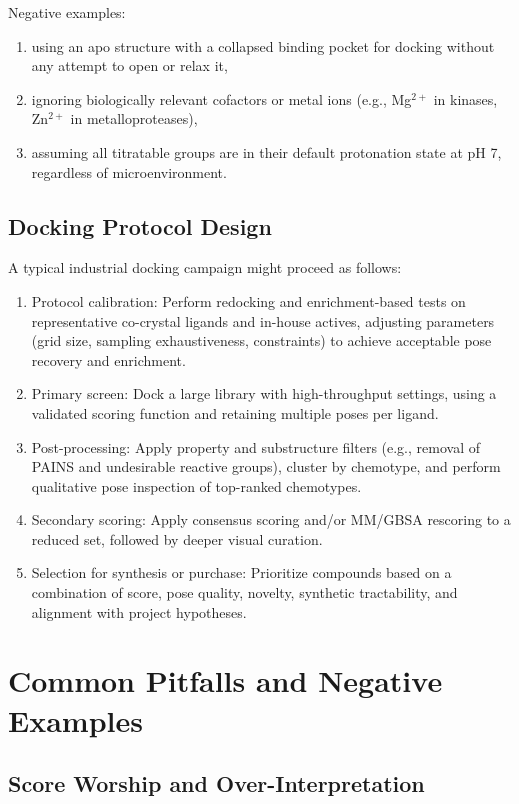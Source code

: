 \documentclass[12pt,a4paper]{article}
\begin{document}
Negative examples:

\begin{enumerate}
  \item using an apo structure with a collapsed binding pocket for docking without any attempt to open or relax it,
  \item ignoring biologically relevant cofactors or metal ions (e.g., Mg$^{2+}$ in kinases, Zn$^{2+}$ in metalloproteases),
  \item assuming all titratable groups are in their default protonation state at pH 7, regardless of microenvironment.
\end{enumerate}

\subsection{Docking Protocol Design}

A typical industrial docking campaign might proceed as follows:

\begin{enumerate}
  \item Protocol calibration: Perform redocking and enrichment-based tests on representative co-crystal ligands and in-house actives, adjusting parameters (grid size, sampling exhaustiveness, constraints) to achieve acceptable pose recovery and enrichment.
  \item Primary screen: Dock a large library with high-throughput settings, using a validated scoring function and retaining multiple poses per ligand.
  \item Post-processing: Apply property and substructure filters (e.g., removal of PAINS and undesirable reactive groups), cluster by chemotype, and perform qualitative pose inspection of top-ranked chemotypes.
  \item Secondary scoring: Apply consensus scoring and/or MM/GBSA rescoring to a reduced set, followed by deeper visual curation.
  \item Selection for synthesis or purchase: Prioritize compounds based on a combination of score, pose quality, novelty, synthetic tractability, and alignment with project hypotheses.
\end{enumerate}


\section{Common Pitfalls and Negative Examples}

\subsection{Score Worship and Over-Interpretation}
\end{document}
